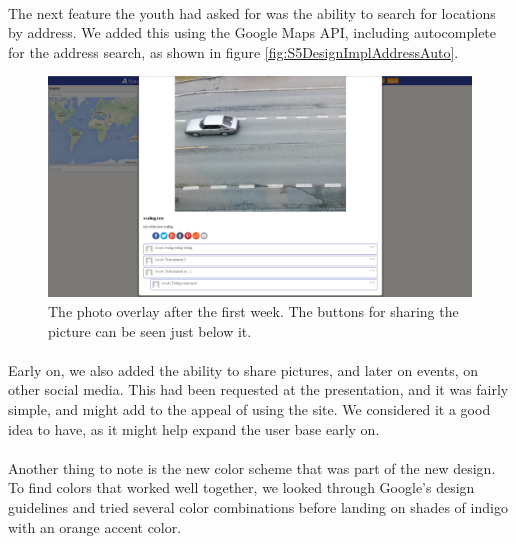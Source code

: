 \paragraph{} The next feature the youth had asked for was the ability to search for locations by address. We added this using the Google Maps API, including autocomplete for the address search, as shown in figure \ref{fig:S5DesignImplAddressAuto}.

\begin{figure}[ht!]
  \centering
  \includegraphics[width=\linewidth]{./img/webpage/27Oct/SinglePhoto27Oct}
  \caption{The photo overlay after the first week. The buttons for sharing the picture can be seen just below it.}
  \label{fig:S5DesignImplSinglePhoto27Oct}
\end{figure}

\paragraph{} Early on, we also added the ability to share pictures, and later on events, on other social media. This had been requested at the presentation, and it was fairly simple, and might add to the appeal of using the site. We considered it a good idea to have, as it might help expand the user base early on.

\paragraph{} Another thing to note is the new color scheme that was part of the new design. To find colors that worked well together, we looked through Google's design guidelines and tried several color combinations before landing on shades of indigo with an orange accent color.

